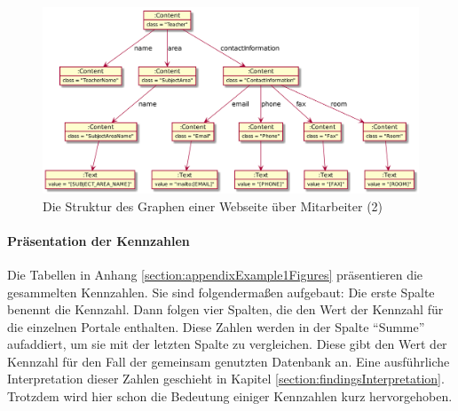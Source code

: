     \begin{figure}[htb]
        \centering
        \includegraphics[scale=\imageScalingFactor]{../resources/findings/case-study-1/dbmodel/dbmodel2.png}
        \caption{Die Struktur des Graphen einer Webseite über Mitarbeiter (2)}
        \label{image:findingTeachersFiguresDbModel2}
    \end{figure}

    \paragraph{Präsentation der Kennzahlen}
    Die Tabellen in Anhang \ref{section:appendixExample1Figures} präsentieren die gesammelten Kennzahlen.
    Sie sind folgendermaßen aufgebaut:
    Die erste Spalte benennt die Kennzahl.
    Dann folgen vier Spalten, die den Wert der Kennzahl für die einzelnen Portale enthalten.
    Diese Zahlen werden in der Spalte "`Summe"' aufaddiert,
    um sie mit der letzten Spalte zu vergleichen.
    Diese gibt den Wert der Kennzahl für den Fall der gemeinsam genutzten Datenbank an.
    Eine ausführliche Interpretation dieser Zahlen geschieht in Kapitel \ref{section:findingsInterpretation}.
    Trotzdem wird hier schon die Bedeutung einiger Kennzahlen kurz hervorgehoben.

